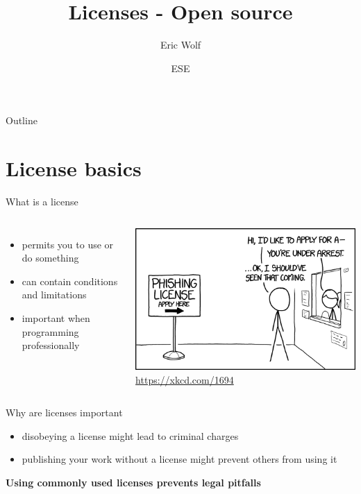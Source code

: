 \documentclass[10pt, graphics, aspectratio=169, table]{beamer}
\title{Licenses - Open source}
\author{Eric Wolf}
\date{ESE \the\year{}}
\institute{Nerd::101 - ESE - ifsr - TU Dresden}
\begin{document}
    \maketitle

    \begin{frame}{Outline}
        \tableofcontents
    \end{frame}

    \section{License basics}
    \begin{frame}{What is a license}
        \begin{columns}
                \begin{itemize}
                    \item permits you to use or do something
                    \item can contain conditions and limitations
                    \item important when programming professionally
                \end{itemize}
                \includegraphics[width=\textwidth]{img/phishing_license.png}
                \center\tiny\url{https://xkcd.com/1694}
        \end{columns}
    \end{frame}

    \begin{frame}{Why are licenses important}
        \begin{itemize}
            \item disobeying a license might lead to criminal charges
            \item publishing your work without a license might prevent others from using it
        \end{itemize}
        \textbf{Using commonly used licenses prevents legal pitfalls}
    \end{frame}
\end{document}
